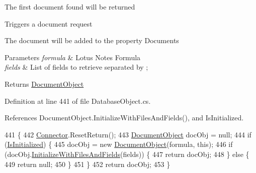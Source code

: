 The first document found will be returned

Triggers a document request

The document will be added to the property \textquotesingle{}Documents\textquotesingle{}


\begin{DoxyParams}{Parameters}
{\em formula} & Lotus Notes Formula\\
\hline
{\em fields} & List of fields to retrieve separated by ; \\
\hline
\end{DoxyParams}
\begin{DoxyReturn}{Returns}
\mbox{\hyperlink{class_document_object}{Document\+Object}}
\end{DoxyReturn}


Definition at line 441 of file Database\+Object.\+cs.



References Document\+Object.\+Initialize\+With\+Files\+And\+Fields(), and Is\+Initialized.


\begin{DoxyCode}
441                                                                                                \{
442         \mbox{\hyperlink{class_connector}{Connector}}.ResetReturn();
443         \mbox{\hyperlink{class_document_object}{DocumentObject}} docObj = null;
444         \textcolor{keywordflow}{if} (\mbox{\hyperlink{class_database_object_a5fe036d32a30eb10d1b3f6a30263f740}{IsInitialized}}) \{
445             docObj = \textcolor{keyword}{new} \mbox{\hyperlink{class_document_object}{DocumentObject}}(formula, \textcolor{keyword}{this});
446             \textcolor{keywordflow}{if} (docObj.\mbox{\hyperlink{class_document_object_a16350c0f471c95c82b418b7f1dc53694}{InitializeWithFilesAndFields}}(fields)) \{
447                 \textcolor{keywordflow}{return} docObj;
448             \} \textcolor{keywordflow}{else} \{
449                 \textcolor{keywordflow}{return} null;
450             \}
451         \}
452         \textcolor{keywordflow}{return} docObj;
453     \}
\end{DoxyCode}
\mbox{\label{class_database_object_a8df18648821ead79c6709a73fd54afeb}} 
